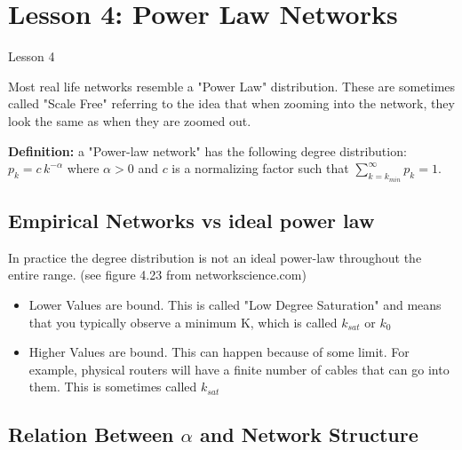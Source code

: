 \documentclass[crop=false]{standalone}
\begin{document}
\section{Lesson 4: Power Law Networks}
Lesson 4

Most real life networks resemble a "Power Law" distribution. These are sometimes called "Scale Free" referring to the idea that when zooming into the network, they look the same as when they are zoomed out.

\textbf{Definition:
}a "Power-law network" has the following degree distribution:
$p_k = c \, k^{- \alpha}$ where $\alpha>0$ and $c$  is a normalizing factor such that $\sum\limits_{k=k_{min}}^{\infty} p_k =1$.




\subsection{Empirical Networks vs ideal power law}
In practice the degree distribution is not an ideal power-law throughout the entire range. (see figure 4.23 from networkscience.com)
\begin{itemize}
    \item Lower Values are bound. This is called "Low Degree Saturation" and means that you typically observe a minimum K, which is called $k_{sat}$ or $k_0$
    \item Higher Values are bound. This can happen because of some limit. For example, physical routers will have a finite number of cables that can go into them. This is sometimes called $k_{sat}$
\end{itemize}


\subsection{Relation Between $\alpha$ and Network Structure}
\end{document}
